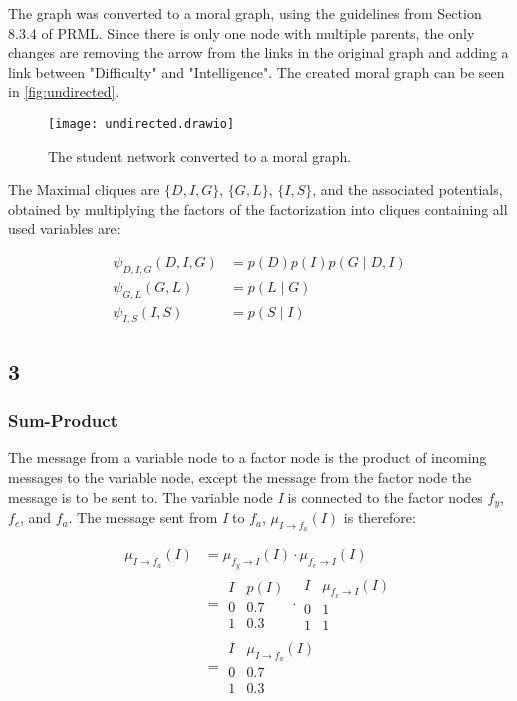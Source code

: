 \documentclass[a4paper, 12pt]{article}
\begin{document}
The graph was converted to a moral graph, using the guidelines from Section 8.3.4 of PRML. Since there is only one node with multiple parents, the only changes are removing the arrow from the links in the original graph and adding a link between "Difficulty" and "Intelligence". The created moral graph can be seen in \autoref{fig:undirected}.

\begin{figure}[h]
	\centering
	\texttt{[image: undirected.drawio]}
	\caption{The student network converted to a moral graph.}
	\label{fig:undirected}
\end{figure}

The Maximal cliques are $\{D, I, G\}$, $\{G, L\}$, $\{I, S\}$, and the associated potentials, obtained by multiplying the factors of the factorization into cliques containing all used variables are:

\begin{align}
	\psi_{D,I,G}(D,I,G) &= p(D)p(I)p(G \mid D,I)\\
	\psi_{G,L}(G,L) &= p(L \mid G)\\
	\psi_{I,S}(I,S) &= p(S \mid I)
\end{align}

\subsection{3}
\subsubsection{Sum-Product}

The message from a variable node to a factor node is the product of incoming messages to the variable node, except the message from the factor node the message is to be sent to. The variable node \textit{I} is connected to the factor nodes $f_y$, $f_c$, and $f_a$. The message sent from \textit{I} to $f_a$, $\mu_{I \to f_a}(I)$ is therefore:

\begin{align}
	\mu_{I \to f_a}(I) &= \mu_{f_y \to I}(I) \cdot \mu_{f_c \to I}(I)\\
	&= \begin{array}{c|c}
		I & p(I)\\
		\hline
		0 & 0.7\\
		1 & 0.3
	\end{array} \cdot \begin{array}{c|c}
	I & \mu_{f_c \to I}(I)\\
	\hline
	0 & 1\\
	1 & 1
\end{array} \\
	&= \begin{array}{c|c}
		I & \mu_{I \to f_a}(I)\\
		\hline
		0 & 0.7\\
		1 & 0.3
	\end{array}
\end{align}
\end{document}
